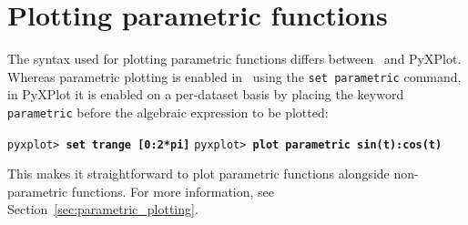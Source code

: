 \section{Plotting parametric functions}

The syntax used for plotting parametric functions differs between \gnuplot\ and
PyXPlot. Whereas parametric plotting is enabled in \gnuplot\ using the {\tt set
parametric} command, in PyXPlot it is enabled on a per-dataset basis by placing
the keyword {\tt parametric} before the algebraic expression to be plotted:

\vspace{3mm}
\newline
{}\newline
{}
\vspace{3mm}\newline
\noindent\texttt{pyxplot> \textbf{set trange [0:2*pi]}}\newline
\noindent\texttt{pyxplot> \textbf{plot parametric sin(t):cos(t)}}
\vspace{3mm}

\noindent This makes it straightforward to plot parametric functions alongside
non-parametric functions. For more information, see
Section~\ref{sec:parametric_plotting}.


